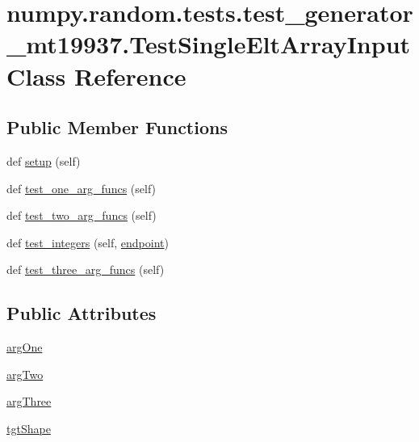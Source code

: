 \hypertarget{classnumpy_1_1random_1_1tests_1_1test__generator__mt19937_1_1TestSingleEltArrayInput}{}\section{numpy.\+random.\+tests.\+test\+\_\+generator\+\_\+mt19937.\+Test\+Single\+Elt\+Array\+Input Class Reference}
\label{classnumpy_1_1random_1_1tests_1_1test__generator__mt19937_1_1TestSingleEltArrayInput}
\subsection*{Public Member Functions}
\begin{DoxyCompactItemize}
\item 
def \hyperlink{classnumpy_1_1random_1_1tests_1_1test__generator__mt19937_1_1TestSingleEltArrayInput_ab25aa25c8ae3e57964bb5d582ad675a8}{setup} (self)
\item 
def \hyperlink{classnumpy_1_1random_1_1tests_1_1test__generator__mt19937_1_1TestSingleEltArrayInput_a23de27a9008a4853a623c28b235715b0}{test\+\_\+one\+\_\+arg\+\_\+funcs} (self)
\item 
def \hyperlink{classnumpy_1_1random_1_1tests_1_1test__generator__mt19937_1_1TestSingleEltArrayInput_abd545e560fc0eb50229e7731e8615226}{test\+\_\+two\+\_\+arg\+\_\+funcs} (self)
\item 
def \hyperlink{classnumpy_1_1random_1_1tests_1_1test__generator__mt19937_1_1TestSingleEltArrayInput_a06cf479673db425dd3092484971095de}{test\+\_\+integers} (self, \hyperlink{namespacenumpy_1_1random_1_1tests_1_1test__generator__mt19937_a3cf8952087f960f78b86fcf9dc3f6a1e}{endpoint})
\item 
def \hyperlink{classnumpy_1_1random_1_1tests_1_1test__generator__mt19937_1_1TestSingleEltArrayInput_af86eb57fd8fae4d35ef88abba3b707cb}{test\+\_\+three\+\_\+arg\+\_\+funcs} (self)
\end{DoxyCompactItemize}
\subsection*{Public Attributes}
\begin{DoxyCompactItemize}
\item 
\hyperlink{classnumpy_1_1random_1_1tests_1_1test__generator__mt19937_1_1TestSingleEltArrayInput_aa61529f9eba5f58a6c91c0f4276953dc}{arg\+One}
\item 
\hyperlink{classnumpy_1_1random_1_1tests_1_1test__generator__mt19937_1_1TestSingleEltArrayInput_af0c88314f7190a9f00266bf488e34fcc}{arg\+Two}
\item 
\hyperlink{classnumpy_1_1random_1_1tests_1_1test__generator__mt19937_1_1TestSingleEltArrayInput_ab592ad767207e86f618a35a5a8eb0edb}{arg\+Three}
\item 
\hyperlink{classnumpy_1_1random_1_1tests_1_1test__generator__mt19937_1_1TestSingleEltArrayInput_a77ed4ca85bb39cacebcea2a7b161c81f}{tgt\+Shape}
\end{DoxyCompactItemize}


